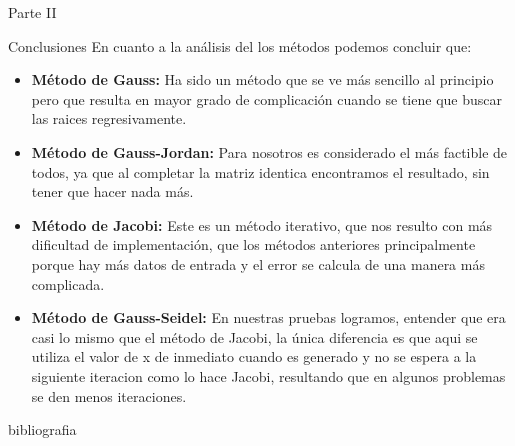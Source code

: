 \documentclass[legalpaper, 12pt]{article}
\begin{document}
\begin{section}{Parte II}
\begin{subsection}{Conclusiones}
      En cuanto a la análisis del los métodos podemos concluir que:
      \begin{itemize}
        \item \textbf{Método de Gauss:} Ha sido un método que se ve más
        sencillo al principio pero que resulta en mayor grado de complicación
        cuando se tiene que buscar las raices regresivamente.
        \item \textbf{Método de Gauss-Jordan:} Para nosotros es considerado el más
        factible de todos, ya que al completar la matriz identica encontramos el
        resultado, sin tener que hacer nada más.
        \item \textbf{Método de Jacobi:} Este es un método iterativo, que nos
        resulto con más dificultad de implementación, que los métodos anteriores
        principalmente porque hay más datos de entrada y el error se calcula
        de una manera más complicada.
        \item \textbf{Método de Gauss-Seidel:} En nuestras pruebas logramos, entender
        que era casi lo mismo que el método de Jacobi, la única diferencia es que
        aqui se utiliza el valor de x de inmediato cuando es generado y no se
        espera a la siguiente iteracion como lo hace Jacobi, resultando que
        en algunos problemas se den menos iteraciones.
      \end{itemize}
    \end{subsection}
  \end{section}
  \newpage
  \nocite{*}
  \begin{bibliography}{bibliografia}
    
  \end{bibliography}
\end{document}
